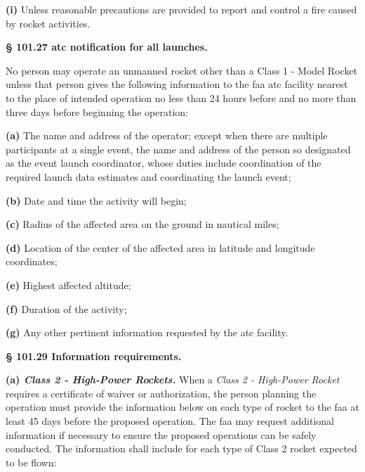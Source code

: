 \textbf{(i)} Unless reasonable precautions are provided to report and control a fire caused by rocket activities.\par

\textbf{§ 101.27 \gls{atc} notification for all launches.}\par

No person may operate an unmanned rocket other than a Class 1 - Model Rocket unless that person gives the following information to the \gls{faa} \gls{atc} facility nearest to the place of intended operation no less than 24 hours before and no more than three days before beginning the operation:\par

\textbf{(a)} The name and address of the operator; except when there are multiple participants at a single event, the name and address of the person so designated as the event launch coordinator, whose duties include coordination of the required launch data estimates and coordinating the launch event;\par

\textbf{(b)} Date and time the activity will begin;\par

\textbf{(c)} Radius of the affected area on the ground in nautical miles;\par

\textbf{(d)} Location of the center of the affected area in latitude and longitude coordinates;\par

\textbf{(e)} Highest affected altitude;\par

\textbf{(f)} Duration of the activity;\par

\textbf{(g)} Any other pertinent information requested by the \gls{atc} facility.\par

\textbf{§ 101.29 Information requirements.}\par

\textbf{(a)\textit{ Class 2 - High-Power Rockets.}} When a \textit{Class 2 - High-Power Rocket} requires a certificate of waiver or authorization, the person planning the operation must provide the information below on each type of rocket to the \gls{faa} at least 45 days before the proposed operation. The \gls{faa} may request additional information if necessary to ensure the proposed operations can be safely conducted. The information shall include for each type of Class 2 rocket expected to be flown:\par

